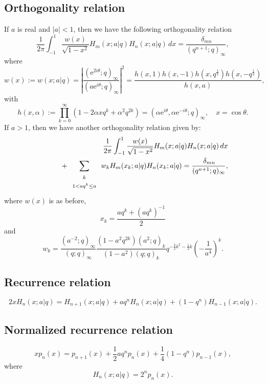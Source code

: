 \documentclass[envcountchap,graybox]{svmono}
\newcommand{\mathindent}{\hspace{7.5mm}}
\newcommand{\e}{\textrm{e}}
\begin{document}
{{\subsection*{Orthogonality relation}
If $a$ is real and $|a|<1$, then we have the following orthogonality relation
\begin{equation}
\label{OrtContBigqHermite1}
\frac{1}{2\pi}\int_{-1}^1\frac{w(x)}{\sqrt{1-x^2}}H_m(x;a|q)H_n(x;a|q)\,dx
=\frac{\,\delta_{mn}}{(q^{n+1};q)_{\infty}},
\end{equation}
where
$$w(x):=w(x;a|q)=\left|\frac{(\e^{2i\theta};q)_{\infty}}
{(a\e^{i\theta};q)_{\infty}}\right|^2=
\frac{h(x,1)h(x,-1)h(x,q^{\frac{1}{2}})h(x,-q^{\frac{1}{2}})}{h(x,a)},$$
with
$$h(x,\alpha):=\prod_{k=0}^{\infty}\left(1-2\alpha xq^k+\alpha^2q^{2k}\right)
=\left(\alpha\e^{i\theta},\alpha\e^{-i\theta};q\right)_{\infty},\quad x=\cos\theta.$$
If $a>1$, then we have another orthogonality relation given by:
\begin{eqnarray}
\label{OrtContBigqHermite2}
& &\frac{1}{2\pi}\int_{-1}^1\frac{w(x)}{\sqrt{1-x^2}}H_m(x;a|q)H_n(x;a|q)\,dx\nonumber\\
& &{}\mathindent{}+\sum_{\begin{array}{c}\scriptstyle k\\ \scriptstyle 1<aq^k\leq a\end{array}}
w_kH_m(x_k;a|q)H_n(x_k;a|q)=\frac{\,\delta_{mn}}{(q^{n+1};q)_{\infty}},
\end{eqnarray}
where $w(x)$ is as before,
$$x_k=\frac{aq^k+\left(aq^k\right)^{-1}}{2}$$
and
$$w_k=\frac{(a^{-2};q)_{\infty}}{(q;q)_{\infty}}
\frac{(1-a^2q^{2k})(a^2;q)_k}{(1-a^2)(q;q)_k}
q^{-\frac{3}{2}k^2-\frac{1}{2}k}\left(-\frac{1}{a^4}\right)^k.$$

\subsection*{Recurrence relation}
\begin{equation}
\label{RecContBigqHermite}
2xH_n(x;a|q)=H_{n+1}(x;a|q)+aq^nH_n(x;a|q)+(1-q^n)H_{n-1}(x;a|q).
\end{equation}

\subsection*{Normalized recurrence relation}
\begin{equation}
\label{NormRecContBigqHermite}
xp_n(x)=p_{n+1}(x)+\frac{1}{2}aq^np_n(x)+\frac{1}{4}(1-q^n)p_{n-1}(x),
\end{equation}
where
$$H_n(x;a|q)=2^np_n(x).$$

}}
\end{document}
